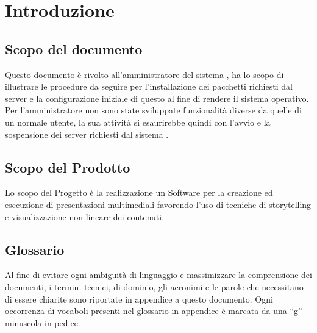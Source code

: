 \section{Introduzione}
\subsection{Scopo del documento}
Questo documento è rivolto all’amministratore del sistema \premi, ha lo scopo di illustrare le procedure da seguire per l'installazione dei pacchetti richiesti dal server e la configurazione iniziale di questo al fine di rendere il sistema \premi operativo. Per l'amministratore non sono state sviluppate funzionalit\`{a} diverse da quelle di un normale utente, la sua attivit\`{a} si esaurirebbe quindi con l'avvio e la sospensione dei server richiesti dal sistema \premi.
\subsection{Scopo del Prodotto}
Lo scopo del Progetto è la realizzazione un Software per la creazione ed esecuzione di presentazioni multimediali favorendo l’uso di tecniche di storytelling e visualizzazione non lineare dei contenuti.
\subsection{Glossario}
Al fine di evitare ogni ambiguità di linguaggio e massimizzare la comprensione dei documenti, i termini tecnici, di dominio, gli acronimi e le parole che necessitano di essere chiarite sono riportate in appendice a questo documento. Ogni occorrenza di vocaboli presenti nel glossario in appendice è marcata da una “g” minuscola in pedice.
